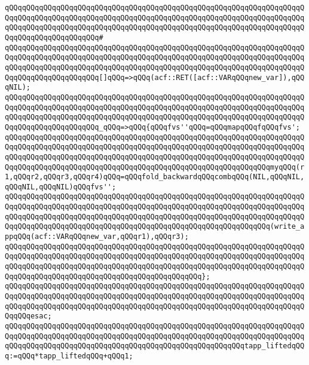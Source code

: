 \verb|qQQqqQQqqQQqqQQqqQQqqQQqqQQqqQQqqQQqqQQqqQQqqQQqqQQqqQQqqQQqqQQqqQQqqQQqqQQqqQQqqQQqqQQqqQQqqQQqqQQqqQQqqQQqqQQqqQQqqQQqqQQqqQQqqQQqqQQqqQQqqQQqqQQqqQQqqQQqqQQqqQQqqQQqqQQqqQQqqQQqqQQqqQQqqQQqqQQqqQQqqQQqqQQqqQQqqQQqqQQqqQQqqQQqqQQq#|\newline
\verb|qQQqqQQqqQQqqQQqqQQqqQQqqQQqqQQqqQQqqQQqqQQqqQQqqQQqqQQqqQQqqQQqqQQqqQQqqQQqqQQqqQQqqQQqqQQqqQQqqQQqqQQqqQQqqQQqqQQqqQQqqQQqqQQqqQQqqQQqqQQqqQQqqQQqqQQqqQQqqQQqqQQqqQQqqQQqqQQqqQQqqQQqqQQqqQQqqQQqqQQqqQQqqQQqqQQqqQQqqQQqqQQqqQQqqQQq[]qQQq=>qQQq(acf::RET([acf::VARqQQqnew_var]),qQQqNIL);|\newline
\newline
\verb|qQQqqQQqqQQqqQQqqQQqqQQqqQQqqQQqqQQqqQQqqQQqqQQqqQQqqQQqqQQqqQQqqQQqqQQqqQQqqQQqqQQqqQQqqQQqqQQqqQQqqQQqqQQqqQQqqQQqqQQqqQQqqQQqqQQqqQQqqQQqqQQqqQQqqQQqqQQqqQQqqQQqqQQqqQQqqQQqqQQqqQQqqQQqqQQqqQQqqQQqqQQqqQQqqQQqqQQqqQQqqQQqqQQqqQQq_qQQq=>qQQq{qQQqfvs''qQQq=qQQqmapqQQqfqQQqfvs';|\newline
\verb|qQQqqQQqqQQqqQQqqQQqqQQqqQQqqQQqqQQqqQQqqQQqqQQqqQQqqQQqqQQqqQQqqQQqqQQqqQQqqQQqqQQqqQQqqQQqqQQqqQQqqQQqqQQqqQQqqQQqqQQqqQQqqQQqqQQqqQQqqQQqqQQqqQQqqQQqqQQqqQQqqQQqqQQqqQQqqQQqqQQqqQQqqQQqqQQqqQQqqQQqqQQqqQQqqQQqqQQqqQQqqQQqqQQqqQQqqQQqqQQqqQQqqQQqqQQqqQQqqQQqqQQqqQQqqQQqmyqQQq(r1,qQQqr2,qQQqr3,qQQqr4)qQQq=qQQqfold_backwardqQQqcombqQQq(NIL,qQQqNIL,qQQqNIL,qQQqNIL)qQQqfvs'';|\newline
\newline
\verb|qQQqqQQqqQQqqQQqqQQqqQQqqQQqqQQqqQQqqQQqqQQqqQQqqQQqqQQqqQQqqQQqqQQqqQQqqQQqqQQqqQQqqQQqqQQqqQQqqQQqqQQqqQQqqQQqqQQqqQQqqQQqqQQqqQQqqQQqqQQqqQQqqQQqqQQqqQQqqQQqqQQqqQQqqQQqqQQqqQQqqQQqqQQqqQQqqQQqqQQqqQQqqQQqqQQqqQQqqQQqqQQqqQQqqQQqqQQqqQQqqQQqqQQqqQQqqQQqqQQqqQQqqQQqqQQq(write_appqQQq(acf::VARqQQqnew_var,qQQqr1),qQQqr3);|\newline
\verb|qQQqqQQqqQQqqQQqqQQqqQQqqQQqqQQqqQQqqQQqqQQqqQQqqQQqqQQqqQQqqQQqqQQqqQQqqQQqqQQqqQQqqQQqqQQqqQQqqQQqqQQqqQQqqQQqqQQqqQQqqQQqqQQqqQQqqQQqqQQqqQQqqQQqqQQqqQQqqQQqqQQqqQQqqQQqqQQqqQQqqQQqqQQqqQQqqQQqqQQqqQQqqQQqqQQqqQQqqQQqqQQqqQQqqQQqqQQqqQQqqQQqqQQqqQQqqQQq};|\newline
\verb|qQQqqQQqqQQqqQQqqQQqqQQqqQQqqQQqqQQqqQQqqQQqqQQqqQQqqQQqqQQqqQQqqQQqqQQqqQQqqQQqqQQqqQQqqQQqqQQqqQQqqQQqqQQqqQQqqQQqqQQqqQQqqQQqqQQqqQQqqQQqqQQqqQQqqQQqqQQqqQQqqQQqqQQqqQQqqQQqqQQqqQQqqQQqqQQqqQQqqQQqqQQqqQQqqQQqqQQqesac;|\newline
\newline
\verb|qQQqqQQqqQQqqQQqqQQqqQQqqQQqqQQqqQQqqQQqqQQqqQQqqQQqqQQqqQQqqQQqqQQqqQQqqQQqqQQqqQQqqQQqqQQqqQQqqQQqqQQqqQQqqQQqqQQqqQQqqQQqqQQqqQQqqQQqqQQqqQQqqQQqqQQqqQQqqQQqqQQqqQQqqQQqqQQqqQQqqQQqqQQqqQQqqQQqtapp_liftedqQQq:=qQQq*tapp_liftedqQQq+qQQq1;|\newline
